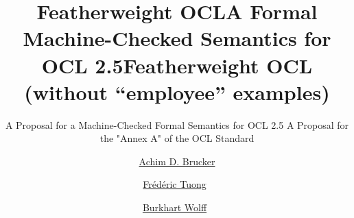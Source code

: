 \documentclass[fontsize=10pt,DIV12,paper=a4,open=right,twoside,abstract=true]{scrreprt}
\begin{document}
\renewcommand{\subsubsectionautorefname}{Section}
\renewcommand{\subsectionautorefname}{Section}
\renewcommand{\sectionautorefname}{Section}
\renewcommand{\chapterautorefname}{Chapter}
\newcommand{\subtableautorefname}{\tableautorefname}
\newcommand{\subfigureautorefname}{\figureautorefname}
\isatagannexa
\renewcommand\thepart{\Alph{part}}
\renewcommand\partname{Annex}
\endisatagannexa

\newenvironment{defholsimple}{\textbf{Definition}\xspace}{}

\newenvironment{matharray}[1]{\[\begin{array}{#1}}{\end{array}\]} %
\newcommand{\indexdef}[3]%
{\ifthenelse{\equal{}{#1}}{\index{#3 (#2)|bold}}{\index{#3 (#1\ #2)|bold}}} %



\isatagafp
  \title{Featherweight OCL}
  \subtitle{A Proposal for a Machine-Checked Formal Semantics for OCL 2.5 %
  }
\endisatagafp
\isatagannexa
  \title{A Formal Machine-Checked Semantics for OCL 2.5}
  \subtitle{A Proposal for the "Annex A" of the OCL Standard}
\endisatagannexa
\isatagnoexample
  \title{Featherweight OCL (without ``employee'' examples)}
\endisatagnoexample
\author{%
  \href{http://www.brucker.ch/}{Achim D. Brucker}\footnotemark[1]
  \and
  \href{https://www.lri.fr/~tuong/}{Fr\'ed\'eric Tuong}\footnotemark[2]~\footnotemark[3]
  \and
  \href{https://www.lri.fr/~wolff/}{Burkhart Wolff}\footnotemark[2]~\footnotemark[3]}
\publishers{%
  \footnotemark[1]~SAP SE\\
  Vincenz-Priessnitz-Str. 1, 76131 Karlsruhe,
  Germany \texorpdfstring{\\}{} \href{mailto:"Achim D. Brucker"
    <achim.brucker@sap.com>}{achim.brucker@sap.com}\\[2em]
  \footnotemark[2]~LRI, Univ. Paris-Sud, CNRS, CentraleSup\'elec, Universit\'e Paris-Saclay \\
  b\^at. 650 Ada Lovelace, 91405 Orsay, France \texorpdfstring{\\}{}
    \href{mailto:"Frederic Tuong"
    <frederic.tuong@lri.fr>}{frederic.tuong@lri.fr} \hspace{4.5em}
    \href{mailto:"Burkhart Wolff"
    <burkhart.wolff@lri.fr>}{burkhart.wolff@lri.fr} \\[2em]
  \footnotemark[3]~IRT SystemX\\
  8 av.~de la Vauve, 91120 Palaiseau, France \texorpdfstring{\\}{}
    \href{mailto:"Frederic Tuong"
    <frederic.tuong@irt-systemx.fr>}{frederic.tuong@irt-systemx.fr} \quad
    \href{mailto:"Burkhart Wolff"
    <burkhart.wolff@irt-systemx.fr>}{burkhart.wolff@irt-systemx.fr}
}
\end{document}
